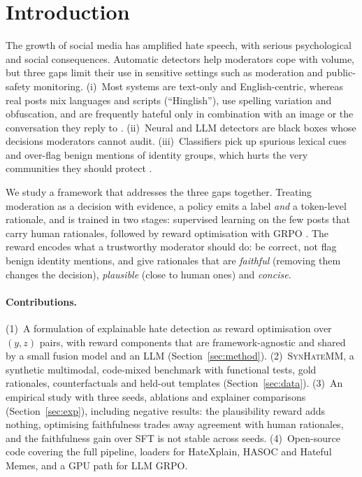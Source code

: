 \documentclass[11pt]{article}
\begin{document}
\section{Introduction}
The growth of social media has amplified hate speech, with serious psychological and social consequences. Automatic
detectors help moderators cope with volume, but three gaps limit their use in sensitive settings such as moderation
and public-safety monitoring. (i)~Most systems are text-only and English-centric, whereas real posts mix languages and
scripts (``Hinglish''), use spelling variation and obfuscation, and are frequently hateful only in combination with an image or the
conversation they reply to \citep{kiela2020hateful,gomez2020mmhs,bohra2018hinglish}. (ii)~Neural and LLM detectors are black boxes whose
decisions moderators cannot audit. (iii)~Classifiers pick up spurious lexical cues and over-flag benign mentions of
identity groups, which hurts the very communities they should protect \citep{dixon2018bias,sap2019risk}.

We study a framework that addresses the three gaps together. Treating moderation as a decision with evidence, a policy
emits a label \emph{and} a token-level rationale, and is trained in two stages: supervised learning on the few
posts that carry human rationales, followed by reward optimisation with GRPO \citep{shao2024deepseekmath}. The reward encodes what
a trustworthy moderator should do: be correct, not flag benign identity mentions, and give rationales that are
\emph{faithful} (removing them changes the decision), \emph{plausible} (close to human ones) and \emph{concise}.

\paragraph{Contributions.}
(1)~A formulation of explainable hate detection as reward optimisation over $(y,z)$ pairs, with reward components
that are framework-agnostic and shared by a small fusion model and an LLM (Section~\ref{sec:method}).
(2)~\textsc{SynHateMM}, a synthetic multimodal, code-mixed benchmark with functional tests, gold rationales, counterfactuals and
held-out templates (Section~\ref{sec:data}).
(3)~An empirical study with three seeds, ablations and explainer comparisons (Section~\ref{sec:exp}), including negative results: the
plausibility reward adds nothing, optimising faithfulness trades away agreement with human rationales, and the faithfulness gain over SFT is not stable across seeds.
(4)~Open-source code covering the full pipeline, loaders for HateXplain, HASOC and Hateful Memes, and a GPU path for LLM GRPO.
\end{document}
